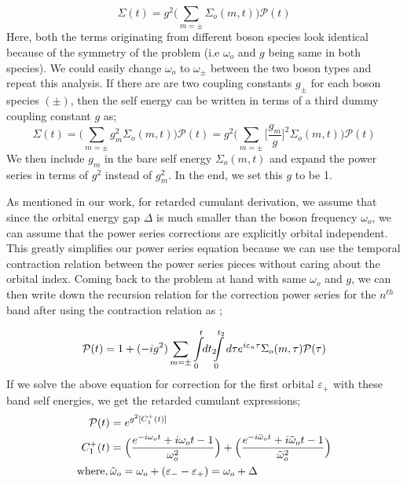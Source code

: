 \documentclass{article}
\begin{document}
\begin{equation*}
    \Sigma(t) = g^2\Big(\sum_{m=\pm} \Sigma_o(m,t)\Big)\mathcal{P}(t)
\end{equation*}
 Here, both the terms originating from different boson species look identical because of the symmetry of the problem (i.e $\omega_o$ and $g$ being same in both species). We could easily change $\omega_o$ to $\omega_\pm$ between the two boson types and repeat this analysis. If there are are two coupling constants $g_\pm$ for each boson species $(\pm)$, then the self energy can be written in terms of a third dummy coupling constant $g$ as;
 \begin{equation*}
    \Sigma(t) = \Big(\sum_{m=\pm} g_m^2 \Sigma_o(m,t)\Big)\mathcal{P}(t) = g^2\Big(\sum_{m=\pm} \Big[\frac{g_m}{g}\Big]^2 \Sigma_o(m,t)\Big)\mathcal{P}(t) 
\end{equation*}
We then include $g_m$ in the bare self energy $\Sigma_o(m,t)$ and expand the power series in terms of $g^2$ instead of $g_m^2$. In the end, we set this $g$ to be 1. 

 As mentioned in our work, for retarded cumulant derivation, we assume that since the orbital energy gap $\Delta$ is much smaller than the boson frequency $\omega_o$, we can assume that the power series corrections are explicitly orbital independent. This greatly simplifies our power series equation because we can use the temporal contraction relation between the power series pieces without caring about the orbital index. Coming back to the problem at hand with same $\omega_o$ and $g$, we can then write down the recursion relation for the correction power series for the $n^{th}$ band after using the contraction relation as ;

\begin{equation*}
\begin{aligned}
        \mathcal{P}(t) = 1+(-ig^2) &\sum_{m=\pm} \int\displaylimits_{0}^{t} \!\!d t_2\!\!\!\int\displaylimits_{0}^{t_2}d\tau e^{i \varepsilon_{n}\tau} \Sigma_o(m,\tau) \mathcal{P}(\tau)\\
\end{aligned}
\end{equation*}
If we solve the above equation for correction for the first orbital $\varepsilon_+$ with these band self energies, we get  the retarded cumulant expressions;
\begin{equation}
\begin{aligned}
\mathcal{P}(t) &= e^{g^2[C_1^+(t)]}\\
C_1^+(t) &= \Big(\frac{e^{-i\omega_o t} + i\omega_o t -1}{\omega_o^2}\Big) + \Big(\frac{e^{-i{\Tilde\omega_o} t} + i{\Tilde\omega_o}t -1}{{\Tilde\omega_o}^2}\Big)\\
\text{where,\,}&{\Tilde\omega_o} = \omega_o +(\varepsilon_{-}-\varepsilon_{+}) = \omega_o +\Delta\\
\end{aligned}
\end{equation}
\end{document}
